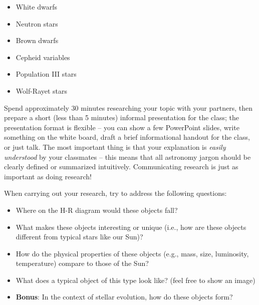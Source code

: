 \documentclass[11pt]{article}
\begin{document}
\begin{itemize}

    \item White dwarfs
    
    \item Neutron stars
    
    \item Brown dwarfs
    
    \item Cepheid variables
    
    \item Population III stars
    
    \item Wolf-Rayet stars
\end{itemize}

Spend approximately 30 minutes researching your topic with your partners, then prepare a short (less than 5 minutes) informal presentation for the class; the presentation format is flexible -- you can show a few PowerPoint slides, write something on the white board, draft a brief informational handout for the class, or just talk. The most important thing is that your explanation is \emph{easily understood} by your classmates -- this means that all astronomy jargon should be clearly defined or summarized intuitively. Communicating research is just as important as doing research!

When carrying out your research, try to address the following questions:
\begin{itemize}
    \item Where on the H-R diagram would these objects fall?
    
    \item What makes these objects interesting or unique (i.e., how are these objects different from typical stars like our Sun)?
    
    \item How do the physical properties of these objects (e.g., mass, size, luminosity, temperature) compare to those of the Sun?
    
    \item What does a typical object of this type look like? (feel free to show an image)
    
    \item \textbf{Bonus}: In the context of stellar evolution, how do these objects form?
\end{itemize}
\end{document}
